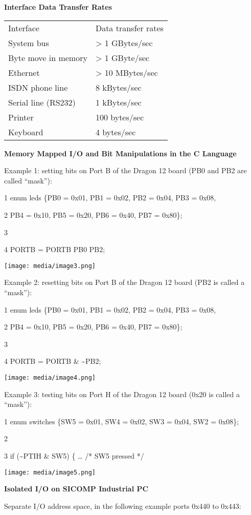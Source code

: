 \textbf{Interface Data Transfer Rates}

\begin{longtable}[c]{@{}ll@{}}
\toprule
Interface & Data transfer rates\tabularnewline
System bus & \textgreater{} 1 GBytes/sec\tabularnewline
Byte move in memory & \textgreater{} 1 GByte/sec\tabularnewline
Ethernet & \textgreater{} 10 MBytes/sec\tabularnewline
ISDN phone line & 8 kBytes/sec\tabularnewline
Serial line (RS232) & 1 kBytes/sec\tabularnewline
Printer & 100 bytes/sec\tabularnewline
Keyboard & 4 bytes/sec\tabularnewline
\bottomrule
\end{longtable}

\textbf{Memory Mapped I/O and Bit Manipulations in the C Language}

Example 1: setting bits on Port B of the Dragon 12 board (PB0 and PB2
are called ``mask''):

1 enum leds \{PB0 = 0x01, PB1 = 0x02, PB2 = 0x04, PB3 = 0x08,

2 PB4 = 0x10, PB5 = 0x20, PB6 = 0x40, PB7 = 0x80\};

3

4 PORTB = PORTB \textbar{} PB0 \textbar{} PB2;

\texttt{[image: media/image3.png]}

Example 2: resetting bits on Port B of the Dragon 12 board (PB2 is
called a ``mask''):

1 enum leds \{PB0 = 0x01, PB1 = 0x02, PB2 = 0x04, PB3 = 0x08,

2 PB4 = 0x10, PB5 = 0x20, PB6 = 0x40, PB7 = 0x80\};

3

4 PORTB = PORTB \& \textasciitilde{}PB2;

\texttt{[image: media/image4.png]}

Example 3: testing bits on Port H of the Dragon 12 board (0x20 is called
a ``mask''):

1 enum switches \{SW5 = 0x01, SW4 = 0x02, SW3 = 0x04, SW2 = 0x08\};

2

3 if (\textasciitilde{}PTIH \& SW5) \{ \ldots{} /* SW5 pressed */

\texttt{[image: media/image5.png]}

\textbf{Isolated I/O on SICOMP Industrial PC}

Separate I/O address space, in the following example ports 0x440 to
0x443:

